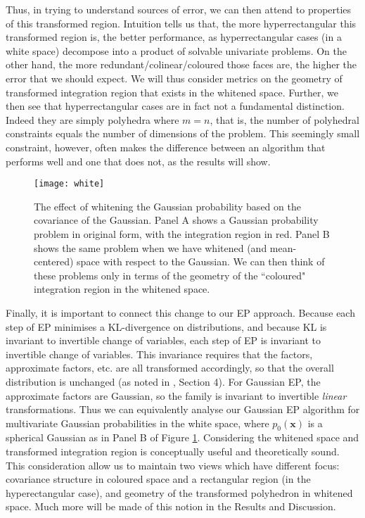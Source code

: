 \documentclass[twoside,11pt]{article}
\def\x{{\mathbf x}}
\begin{document}
Thus, in trying to understand sources of error, we can then attend to properties of this transformed region.  Intuition tells us that, the more hyperrectangular this transformed region is, the better performance, as hyperrectangular cases (in a white space) decompose into a product of solvable univariate problems.  On the other hand, the more redundant/colinear/coloured those faces are, the higher the error that we should expect.    We will thus consider metrics on the geometry of transformed integration region that exists in the whitened space. Further, we then see that hyperrectangular cases are in fact not a fundamental distinction.  Indeed they are simply polyhedra where $m=n$, that is, the number of polyhedral constraints equals the number of dimensions of the problem.  This seemingly small constraint, however, often makes the difference between an algorithm that performs well and one that does not, as the results will show.  

\begin{figure}
\centering
\hspace{0.0cm}
\texttt{[image: white]}
\caption{\small{The effect of whitening the Gaussian probability based on the covariance of the Gaussian.  Panel A shows a Gaussian probability problem in original form, with the integration region in red.  Panel B shows the same problem when we have whitened (and mean-centered) space with respect to the Gaussian.  We can then think of these problems only in terms of the geometry of the ``coloured" integration region in the whitened space.}}
\label{fig:white} %
\end{figure}

Finally, it is important to connect this change to our EP approach.  Because each step of EP minimises a KL-divergence on distributions, and because KL is invariant to
invertible change of variables, each step of EP is invariant to invertible change of variables.  This invariance requires that the factors, approximate factors, etc. are all transformed accordingly, so that the overall distribution is unchanged (as noted in \cite{seeger08epexpfam}, Section 4). For Gaussian EP, the approximate factors are Gaussian, so the family is invariant to invertible \emph{linear} transformations.  Thus we can equivalently analyse our Gaussian EP algorithm for multivariate Gaussian probabilities in the white space, where $p_0(\x)$ is a spherical Gaussian as in Panel B of Figure \ref{fig:white}.   Considering the whitened space and transformed integration region is conceptually useful and theoretically sound.  This consideration allow us to maintain two views which have different focus: covariance structure in coloured space and a rectangular region (in the hyperectangular case), and geometry of the transformed polyhedron in whitened space.  Much more will be made of this notion in the Results and Discussion.
\end{document}
